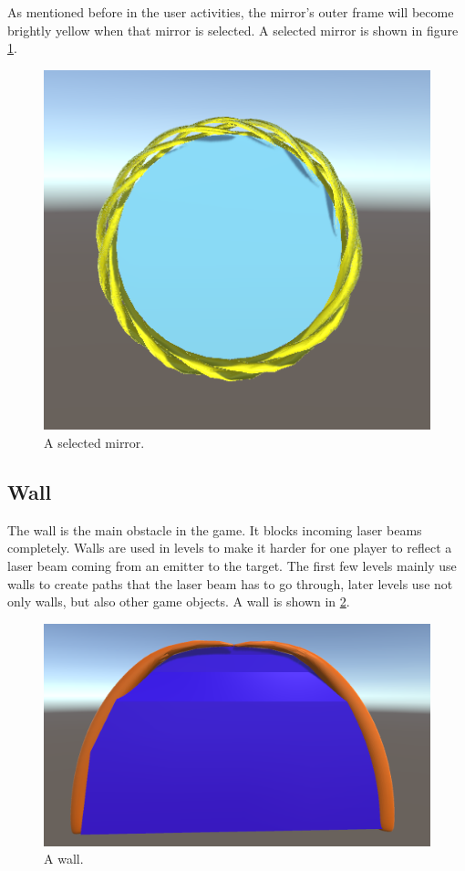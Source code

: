 			As mentioned before in the user activities, the mirror's outer
			frame will become brightly yellow when that mirror is selected.
			A selected mirror is shown in figure \ref{fig:selectedmirror}.
			\begin{figure}[!ht]
				\centering
				\includegraphics[scale = 0.3]{SelectedMirror}
				\caption{A selected mirror.}
				\label{fig:selectedmirror}
			\end{figure}
			
		\subsection{Wall} \label{ssec:wall}
			The wall is the main obstacle in the game. It blocks incoming
			laser beams completely. Walls are used in levels to make it 
			harder for one player to reflect a laser beam coming from
			an emitter to the target. The first few levels mainly use walls
			to create paths that the laser beam has to go through, later
			levels use not only walls, but also other game objects. A wall
			is shown in \ref{fig:wall}.
			\begin{figure}[!ht]
				\centering
				\includegraphics[scale = 0.15]{Wall}
				\caption{A wall.}
				\label{fig:wall}
			\end{figure}
			
